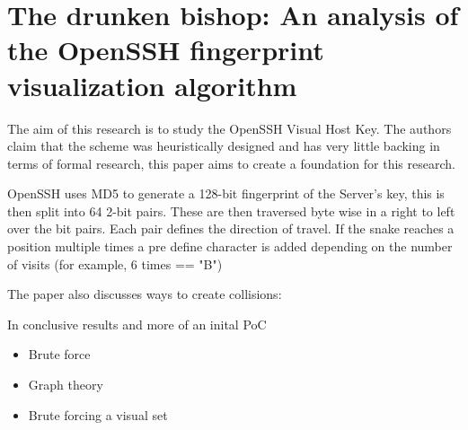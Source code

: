 \section{The drunken bishop: An analysis of the OpenSSH
fingerprint visualization algorithm}

The aim of this research is to study the OpenSSH Visual Host Key. The authors claim that the scheme was heuristically designed and has very little backing in terms of formal research, this paper aims to create a foundation for this research.

OpenSSH uses MD5 to generate a 128-bit fingerprint of the Server's key, this is then split into 64 2-bit pairs. These are then traversed byte wise in a right to left over the bit pairs. Each pair defines the direction of travel. If the snake reaches a position multiple times a pre define character is added depending on the number of visits (for example, 6 times == "B")

The paper also discusses ways to create collisions:

In conclusive results and more of an inital PoC

\begin{itemize}
    \item Brute force
    \item Graph theory
    \item Brute forcing a visual set
\end{itemize}